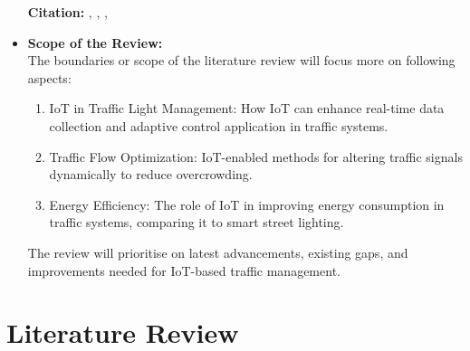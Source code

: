 \documentclass[12pt,a4paper]{article}
\begin{document}
\begin{itemize}
\textbf{Citation:} \cite{10568678}, \cite{10060318}, \cite{10384717}, \cite{9914294}

\item \textbf{Scope of the Review:}\\

The boundaries or scope of the literature review will focus more on following aspects: 

\begin{enumerate}
    \item IoT in Traffic Light Management: How IoT can enhance real-time data collection and adaptive control application in traffic systems. 
    \item Traffic Flow Optimization: IoT-enabled methods for altering traffic signals dynamically to reduce overcrowding. 
    \item Energy Efficiency: The role of IoT in improving energy consumption in traffic systems, comparing it to smart street lighting. 
\end{enumerate}

The review will prioritise on latest advancements, existing gaps, and improvements needed for IoT-based traffic management. 

\end{itemize}

\section{Literature Review}
\end{document}

